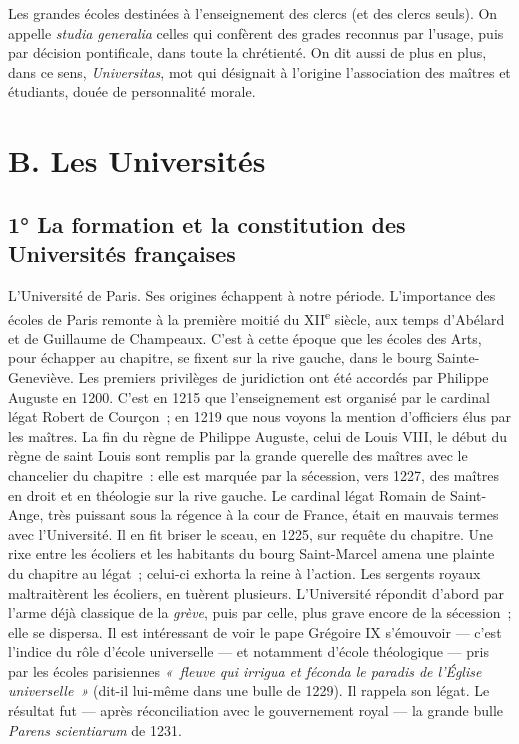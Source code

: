 \documentclass[french,twoside]{book} %
\newcommand\foreign[1]{\emph{#1}}
\begin{document}
\noindent Les grandes écoles destinées à l’enseignement des clercs (et des clercs seuls). On appelle \foreign{studia generalia} celles qui confèrent des grades reconnus par l’usage, puis par décision pontificale, dans toute la chrétienté. On dit aussi de plus en plus, dans ce sens, {\itshape Universitas}, mot qui désignait à l’origine l’association des maîtres et étudiants, douée de personnalité morale.
\section[{B. Les Universités}]{B. Les Universités}
\label{c11b}
\subsection[{1° La formation et la constitution des Universités françaises}]{1° La formation et la constitution des Universités françaises}
\noindent L’Université de Paris. Ses origines échappent à notre période. L’importance des écoles de Paris remonte à la première moitié du XII\textsuperscript{e} siècle, aux temps d’Abélard et de Guillaume de Champeaux. C’est à cette époque que les écoles des Arts, pour échapper au chapitre, se fixent sur la rive gauche, dans le bourg Sainte-Geneviève. Les premiers privilèges de juridiction ont été accordés par Philippe Auguste en 1200. C’est en 1215 que l’enseignement est organisé par le cardinal légat Robert de Courçon ; en 1219 que nous voyons la mention d’officiers élus par les maîtres. La fin du règne de Philippe Auguste, celui de Louis VIII, le début du règne de saint Louis sont remplis par la grande querelle des maîtres avec le chancelier du chapitre : elle est marquée par la sécession, vers 1227, des maîtres en droit et en théologie sur la rive gauche. Le cardinal légat Romain de Saint-Ange, très puissant sous la régence à la cour de France, était en mauvais termes avec l’Université. Il en fit briser le sceau, en 1225, sur requête du chapitre. Une rixe entre les écoliers et les habitants du bourg Saint-Marcel amena une plainte du chapitre au légat ; celui-ci exhorta la reine à l’action. Les sergents royaux maltraitèrent les écoliers, en tuèrent plusieurs. L’Université répondit d’abord par l’arme déjà classique de la \emph{grève}, puis par celle, plus grave encore de la sécession ; elle se dispersa. Il est intéressant de voir le pape Grégoire IX s’émouvoir — c’est l’indice du rôle d’école universelle — et notamment d’école théologique — pris par les écoles parisiennes \emph{« fleuve qui irrigua et féconda le paradis de l’Église universelle »} (dit-il lui-même dans une bulle de 1229). Il rappela son légat. Le résultat fut — après réconciliation avec le gouvernement royal — la grande bulle {\itshape Parens scientiarum} de 1231.\par
\end{document}
